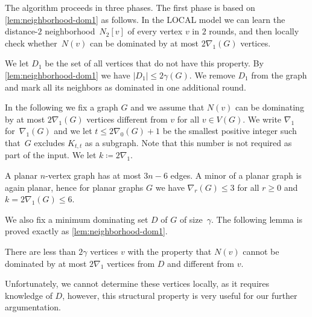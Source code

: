 The algorithm proceeds in three phases. The first phase is
based on \cref{lem:neighborhood-dom1} as follows.
In the LOCAL model we can learn the distance-$2$
neighborhood~$N_2[v]$ of every vertex $v$ in $2$ rounds,
and then locally check
whether~$N(v)$ can be domi\-nated by at most $2\nabla_1(G)$
vertices.

\begin{tcolorbox}
We let $D_1$ be the set of all vertices that do not have this
property. By \cref{lem:neighborhood-dom1}
we have $|D_1|\leq 2\gamma(G)$. We remove $D_1$ from the
graph and mark all its neighbors as dominated in one additional round.
\end{tcolorbox}


In the following we fix a graph $G$ and we assume that $N(v)$ can be
dominating by at most $2\nabla_1(G)$ vertices different from $v$
for all $v\in V(G)$. We write $\nabla_1$ for~$\nabla_1(G)$ and
we let $t\leq 2\nabla_0(G)+1$ be the smallest positive integer
 such that~$G$ excludes
$K_{t,t}$ as a subgraph. Note that this number is not required
as part of the input. We let $k\coloneq 2\nabla_1$.

\begin{example}
  A planar $n$-vertex graph has at most $3n-6$ edges. A minor of a
  planar graph is again planar, hence for planar graphs $G$ we have $\nabla_r(G) \leq 3$ for all $r\geq 0$ and $k=2\nabla_1(G)\leq 6$.
\end{example}

We also fix a minimum dominating set $D$ of $G$
of size~$\gamma$.
The following lemma is proved exactly as \cref{lem:neighborhood-dom1}.

\begin{lemma}\label{lem:neighborhood-dom2}
There are less than $2\gamma$ vertices $v$ with the property
that $N(v)$ cannot be dominated by at most $2\nabla_1$ vertices
from $D$ and different from $v$.
\end{lemma}

Unfortunately, we cannot determine these vertices locally, as it requires
know\-ledge of $D$, however, this structural property is very useful for
our further argumentation.

